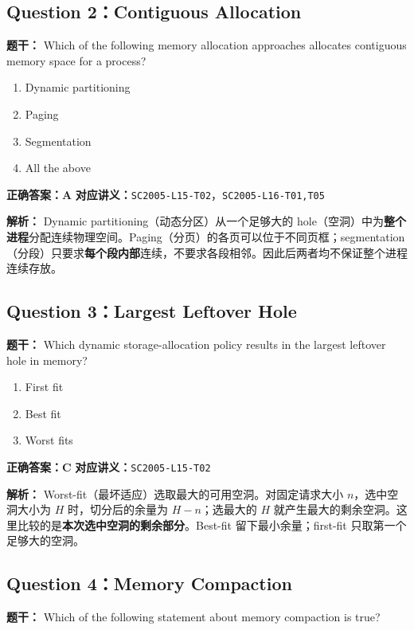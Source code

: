 \documentclass[11pt,a4paper,fontset=fandol]{ctexart}
\renewcommand{\exercisequestion}[2]{%
  \Needspace{5\baselineskip}%
  \subsection{#2}\label{exercise:#1}%
}
\renewenvironment{checkedsolution}
  {\par\nopagebreak[4]\textbf{解析：}\ignorespaces}
  {\par}
\begin{document}
\exercisequestion{SC2005-HW05-Q02}{Question 2：Contiguous Allocation}

\textbf{题干：} Which of the following memory allocation approaches allocates contiguous memory space for a process?

\begin{enumerate}[label=\Alph*.,leftmargin=2.4em]
  \item Dynamic partitioning
  \item Paging
  \item Segmentation
  \item All the above
\end{enumerate}

\textbf{正确答案：A}\qquad
\textbf{对应讲义：}\texttt{SC2005-L15-T02}，\texttt{SC2005-L16-T01,T05}

\begin{checkedsolution}
Dynamic partitioning（动态分区）从一个足够大的 hole（空洞）中为\textbf{整个进程}分配连续物理空间。Paging（分页）的各页可以位于不同页框；segmentation（分段）只要求\textbf{每个段内部}连续，不要求各段相邻。因此后两者均不保证整个进程连续存放。
\end{checkedsolution}

\exercisequestion{SC2005-HW05-Q03}{Question 3：Largest Leftover Hole}

\textbf{题干：} Which dynamic storage-allocation policy results in the largest leftover hole in memory?

\begin{enumerate}[label=\Alph*.,leftmargin=2.4em]
  \item First fit
  \item Best fit
  \item Worst fits
\end{enumerate}

\textbf{正确答案：C}\qquad
\textbf{对应讲义：}\texttt{SC2005-L15-T02}

\begin{checkedsolution}
Worst-fit（最坏适应）选取最大的可用空洞。对固定请求大小 $n$，选中空洞大小为 $H$ 时，切分后的余量为 $H-n$；选最大的 $H$ 就产生最大的剩余空洞。这里比较的是\textbf{本次选中空洞的剩余部分}。Best-fit 留下最小余量；first-fit 只取第一个足够大的空洞。
\end{checkedsolution}

\exercisequestion{SC2005-HW05-Q04}{Question 4：Memory Compaction}

\textbf{题干：} Which of the following statement about memory compaction is true?
\end{document}
